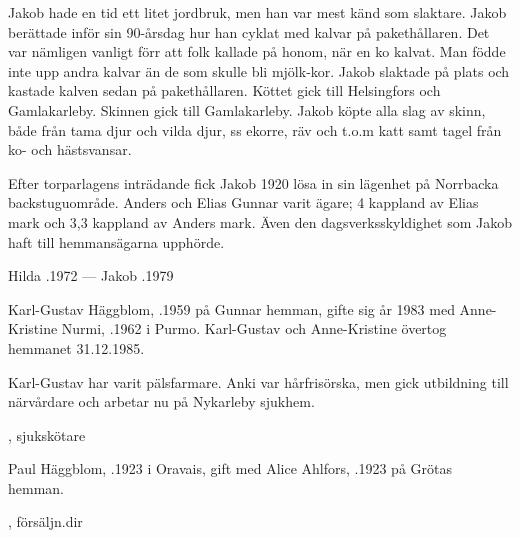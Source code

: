 Jakob hade en tid ett litet jordbruk, men han var mest känd som slaktare. Jakob berättade inför sin 90-årsdag hur han cyklat med kalvar på pakethållaren. Det var nämligen vanligt förr att folk kallade på honom, när en ko kalvat. Man födde inte upp andra kalvar än de som skulle bli mjölk-kor. Jakob slaktade på plats och kastade kalven sedan på pakethållaren. Köttet gick till Helsingfors och Gamlakarleby. Skinnen gick till Gamlakarleby. Jakob köpte alla slag av skinn, både från tama djur och vilda djur, ss ekorre, räv och t.o.m katt samt tagel från ko- och hästsvansar.

Efter torparlagens inträdande fick Jakob 1920 lösa in sin lägenhet på Norrbacka backstuguområde. Anders och Elias Gunnar varit ägare; 4 kappland av Elias mark och 3,3 kappland av Anders mark. Även den dagsverksskyldighet som Jakob haft till hemmansägarna upphörde.

Hilda .1972  ---  Jakob .1979






Karl-Gustav Häggblom, .1959 på Gunnar hemman, gifte sig år 1983 med Anne-Kristine Nurmi, .1962 i Purmo. Karl-Gustav och Anne-Kristine övertog hemmanet 31.12.1985.

Karl-Gustav har varit pälsfarmare. Anki var hårfrisörska, men gick utbildning till närvårdare och arbetar nu på Nykarleby sjukhem.
\begin{jhchildren}
  \item {}
  \item {}, sjukskötare
\end{jhchildren}


Paul Häggblom, .1923 i Oravais, gift med Alice Ahlfors, .1923 på Grötas hemman.
\begin{jhchildren}
  \item {}
  \item {}, försäljn.dir
  \item {}
  \item {}
  \item {}
\end{jhchildren}

